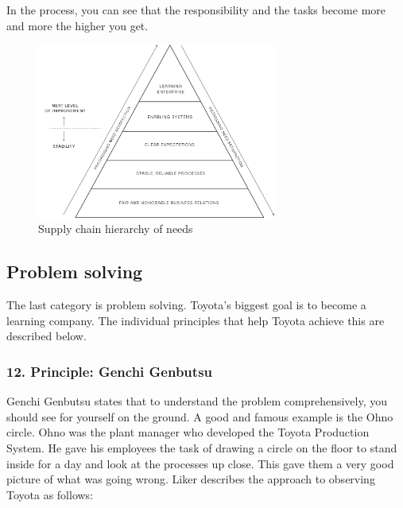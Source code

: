 \documentclass[a4paper,11pt]{article}
\begin{document}
In the process, you can see that the responsibility and the tasks become more
and more the higher you get.

\begin{figure}[h] 
  \centering
     \includegraphics[width=0.7\textwidth]{Netzwerk.png}
  \caption{Supply chain hierarchy of needs}
  \label{Netzwerk}
\end{figure}

\subsection{Problem solving}

The last category is problem solving. Toyota's biggest goal is to become a
learning company. The individual principles that help Toyota achieve this are
described below.

\subsubsection*{12. Principle: Genchi Genbutsu}

Genchi Genbutsu states that to understand the problem comprehensively, you
should see for yourself on the ground. A good and famous example is the Ohno
circle. Ohno was the plant manager who developed the Toyota Production
System. He gave his employees the task of drawing a circle on the floor to
stand inside for a day and look at the processes up close. This gave them a
very good picture of what was going wrong. Liker describes the approach to
observing Toyota as follows:
\end{document}
